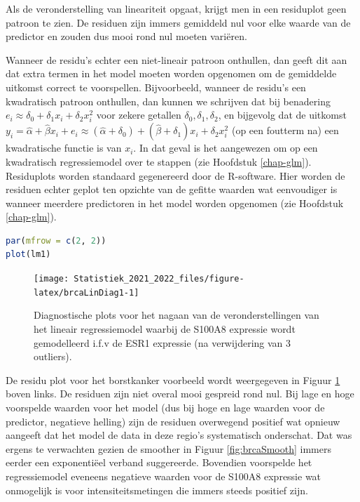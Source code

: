 \documentclass[
  12pt,dutch,coursenotes]{book}
\theoremstyle{definition}
\theoremstyle{definition}
\theoremstyle{definition}
\theoremstyle{definition}
\theoremstyle{remark}
\begin{document}
Als de veronderstelling van lineariteit opgaat, krijgt men in een residuplot geen patroon te zien.
De residuen zijn immers gemiddeld nul voor elke waarde van de predictor en zouden dus mooi rond nul moeten variëren.

Wanneer de residu's echter een niet-lineair patroon onthullen, dan geeft dit aan dat extra termen in het model moeten worden opgenomen om de
gemiddelde uitkomst correct te voorspellen. Bijvoorbeeld, wanneer de residu's een kwadratisch patroon onthullen, dan kunnen we schrijven dat bij benadering \(e_i\approx \delta_0+\delta_1 x_i+\delta_2 x_i^2\) voor zekere getallen \(\delta_0,\delta_1,\delta_2\), en bijgevolg
dat de uitkomst \(y_i=\hat{\alpha}+\hat{\beta}x_i+e_i\approx (\hat{\alpha}+\delta_0)+(\hat{\beta}+\delta_1)x_i+\delta_2 x_i^2\) (op een foutterm na) een kwadratische functie is van \(x_i\). In dat geval is het aangewezen om op een kwadratisch regressiemodel over te stappen (zie Hoofdstuk \ref{chap-glm}).
Residuplots worden standaard gegenereerd door de R-software. Hier worden de residuen echter geplot ten opzichte van de gefitte waarden wat eenvoudiger is wanneer meerdere predictoren in het model worden opgenomen (zie Hoofdstuk \ref{chap-glm}).

\begin{lstlisting}[language=R]
par(mfrow = c(2, 2))
plot(lm1)
\end{lstlisting}

\begin{figure}

{\centering \texttt{[image: Statistiek\_2021\_2022\_files/figure-latex/brcaLinDiag1-1]} 

}

\caption{Diagnostische plots voor het nagaan van de veronderstellingen van het lineair regressiemodel waarbij de S100A8 expressie wordt gemodelleerd i.f.v de ESR1 expressie (na verwijdering van 3 outliers).}\label{fig:brcaLinDiag1}
\end{figure}

De residu plot voor het borstkanker voorbeeld wordt weergegeven in Figuur \ref{fig:brcaLinDiag1} boven links.
De residuen zijn niet overal mooi gespreid rond nul.
Bij lage en hoge voorspelde waarden voor het model (dus bij hoge en lage waarden voor de predictor, negatieve helling) zijn de residuen overwegend positief wat opnieuw aangeeft dat het model de data in deze regio's systematisch onderschat.
Dat was ergens te verwachten gezien de smoother in Figuur \ref{fig:brcaSmooth} immers eerder een exponentiëel verband suggereerde.
Bovendien voorspelde het regressiemodel eveneens negatieve waarden voor de S100A8 expressie wat onmogelijk is voor intensiteitsmetingen die immers steeds positief zijn.
\end{document}
